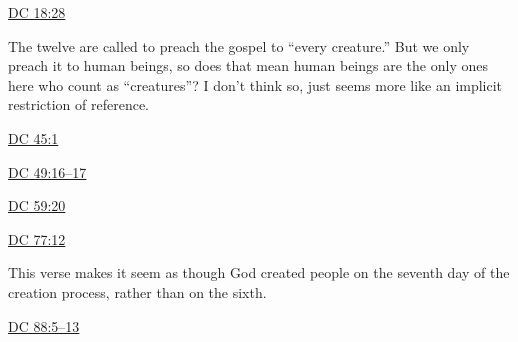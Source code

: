 		\begin{compactdesc}
			\item[{\hyperref[DC18-28]{DC 18:28}}] \phantom{.}
				\begin{compactitem}
					\item The twelve are called to preach the gospel to ``every creature.'' But we only preach it to human beings, so does that mean human beings are the only ones here who count as ``creatures''? I don't think so, just seems more like an implicit restriction of reference.
				\end{compactitem}
			\item[{\hyperref[DC45-1]{DC 45:1}}]
			\item[{\hyperref[DC49-16]{DC 49:16--17}}]
			\item[{\hyperref[DC59-20]{DC 59:20}}]
			\item[{\hyperref[DC77-12]{DC 77:12}}] \phantom{.}
				\begin{compactitem}
					\item This verse makes it seem as though God created people on the seventh day of the creation process, rather than on the sixth.
				\end{compactitem}
			\item[{\hyperref[DC88-5]{DC 88:5--13}}]
		\end{compactdesc}
		
	
		
		

	
